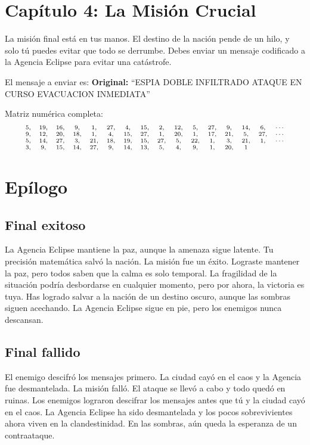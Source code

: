 \documentclass[10pt,a4paper]{article}
\begin{document}
\section*{Capítulo 4: La Misión Crucial}

La misión final está en tus manos. El destino de la nación pende de un hilo, y solo tú puedes evitar que todo se derrumbe. Debes enviar un mensaje codificado a la Agencia Eclipse para evitar una catástrofe.

El mensaje a enviar es:
\textbf{Original:} ``ESPIA DOBLE INFILTRADO ATAQUE EN CURSO EVACUACION INMEDIATA''

Matriz numérica completa:
\[
\scriptsize
\begin{array}{cccccccccccccccccccccc}
5, & 19, & 16, & 9, & 1, & 27, & 4, & 15, & 2, & 12, & 5, & 27, & 9, & 14, & 6, & \cdots \\
9, & 12, & 20, & 18, & 1, & 4, & 15, & 27, & 1, & 20, & 1, & 17, & 21, & 5, & 27, & \cdots \\
5, & 14, & 27, & 3, & 21, & 18, & 19, & 15, & 27, & 5, & 22, & 1, & 3, & 21, & 1, & \cdots \\
3, & 9, & 15, & 14, & 27, & 9, & 14, & 13, & 5, & 4, & 9, & 1, & 20, & 1 & &
\end{array}
\]

\section*{Epílogo}

\subsection*{Final exitoso}
La Agencia Eclipse mantiene la paz, aunque la amenaza sigue latente. Tu precisión matemática salvó la nación. La misión fue un éxito. Lograste mantener la paz, pero todos saben que la calma es solo temporal. La fragilidad de la situación podría desbordarse en cualquier momento, pero por ahora, la victoria es tuya. Has logrado salvar a la nación de un destino oscuro, aunque las sombras siguen acechando. La Agencia Eclipse sigue en pie, pero los enemigos nunca descansan.

\subsection*{Final fallido}
El enemigo descifró los mensajes primero. La ciudad cayó en el caos y la Agencia fue desmantelada. La misión falló. El ataque se llevó a cabo y todo quedó en ruinas. Los enemigos lograron descifrar los mensajes antes que tú y la ciudad cayó en el caos. La Agencia Eclipse ha sido desmantelada y los pocos sobrevivientes ahora viven en la clandestinidad. En las sombras, aún queda la esperanza de un contraataque.
\end{document}
